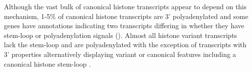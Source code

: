 	Although the vast bulk of canonical histone transcripts appear to depend on this mechanism, 
	1-5\% of canonical histone transcripts are 3' polyadenylated  
	and some genes have annotations indicating two transcripts 
	differing in whether they have stem-loop or polyadenylation signals (). 
	Almost all histone variant transcripts lack the stem-loop and are polyadenylated 
	with the exception of transcripts with 3' properties alternatively displaying
	variant or canonical features including a canonical histone stem-loop \citep{HTwoAX-transcripts}. 

  \begin{figure*}
    \centering
    \hfill
  \end{figure*}

